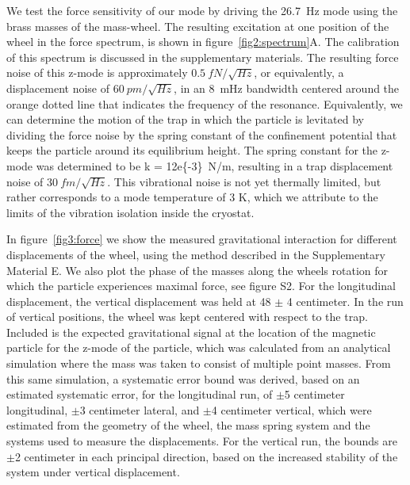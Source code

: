 \documentclass[pdflatex,sn-mathphys,12pt]{sn-jnl}
\begin{document}
    We test the force sensitivity of our mode by driving the \SI{26.7}{Hz} mode using the brass masses of the mass-wheel. 
    The resulting excitation at one position of the wheel in the force spectrum, is shown in figure~\ref{fig2:spectrum}A. 
    The calibration of this spectrum is discussed in the supplementary materials. 
    The resulting force noise of this z-mode is approximately $\SI{0.5}{fN/\sqrt{Hz}}$,  or equivalently, a displacement noise of $\SI{60}{pm/\sqrt{Hz}}$, in an \SI{8}{mHz} bandwidth centered around the orange dotted line that indicates the frequency of the resonance. 
    Equivalently, we can determine the motion of the trap in which the particle is levitated by dividing the force noise by the spring constant of the confinement potential that keeps the particle around its equilibrium height. 
    The spring constant for the z-mode was determined to be k = \SI{12e{-3}}{N/m}, resulting in a trap displacement noise of $\SI{30}{fm/\sqrt{Hz}}$.
    This vibrational noise is not yet thermally limited, but rather corresponds to a mode temperature of 3 K, which we attribute to the limits of the vibration isolation inside the cryostat.
    
    In figure~\ref{fig3:force} we show the measured gravitational interaction for different displacements of the wheel, using the method described in the Supplementary Material E. We also plot the phase of the masses along the wheels rotation for which the particle experiences maximal force, see figure S2. For the longitudinal displacement, the vertical displacement was held at \SI{48}{} $\pm$ \SI{4}{} centimeter. In the run of vertical positions, the wheel was kept centered with respect to the trap. Included is the expected gravitational signal at the location of the magnetic particle for the z-mode of the particle, which was calculated from an analytical simulation where the mass was taken to consist of multiple point masses. From this same simulation, a systematic error bound was derived, based on an estimated systematic error, for the longitudinal run, of $\pm$5 centimeter longitudinal, $\pm$3 centimeter lateral, and $\pm$4 centimeter vertical, which were estimated from the geometry of the wheel, the mass spring system and the systems used to measure the displacements. For the vertical run, the bounds are $\pm$2 centimeter in each principal direction, based on the increased stability of the system under vertical displacement.
\end{document}

